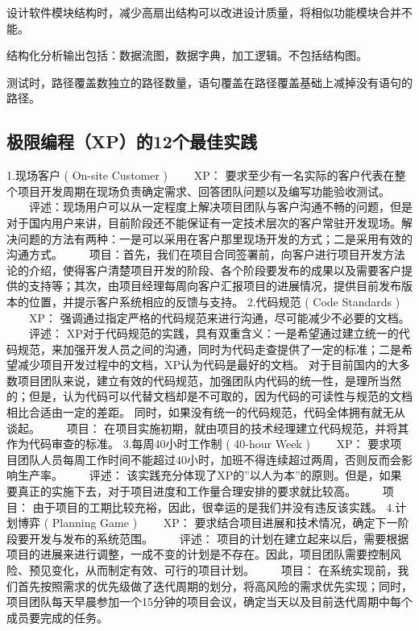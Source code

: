 \documentclass[UTF8]{../computerUniverse}
\begin{document}
设计软件模块结构时，减少高扇出结构可以改进设计质量，将相似功能模块合并不能。

结构化分析输出包括：数据流图，数据字典，加工逻辑。不包括结构图。




测试时，路径覆盖数独立的路径数量，语句覆盖在路径覆盖基础上减掉没有语句的路径。




\subsection{极限编程（XP）的12个最佳实践}
1.现场客户 ( On-site Customer )
　　XP： 要求至少有一名实际的客户代表在整个项目开发周期在现场负责确定需求、回答团队问题以及编写功能验收测试。
　　评述：现场用户可以从一定程度上解决项目团队与客户沟通不畅的问题，但是对于国内用户来讲，目前阶段还不能保证有一定技术层次的客户常驻开发现场。解决问题的方法有两种：一是可以采用在客户那里现场开发的方式；二是采用有效的沟通方式。
　　项目：首先，我们在项目合同签署前，向客户进行项目开发方法论的介绍，使得客户清楚项目开发的阶段、各个阶段要发布的成果以及需要客户提供的支持等；其次，由项目经理每周向客户汇报项目的进展情况，提供目前发布版本的位置，并提示客户系统相应的反馈与支持。
2.代码规范 ( Code Standards )
　　XP： 强调通过指定严格的代码规范来进行沟通，尽可能减少不必要的文档。
　　评述： XP对于代码规范的实践，具有双重含义：一是希望通过建立统一的代码规范，来加强开发人员之间的沟通，同时为代码走查提供了一定的标准；二是希望减少项目开发过程中的文档，XP认为代码是最好的文档。
对于目前国内的大多数项目团队来说，建立有效的代码规范，加强团队内代码的统一性，是理所当然的；但是，认为代码可以代替文档却是不可取的，因为代码的可读性与规范的文档相比合适由一定的差距。
同时，如果没有统一的代码规范，代码全体拥有就无从谈起。
　　项目： 在项目实施初期，就由项目的技术经理建立代码规范，并将其作为代码审查的标准。
3.每周40小时工作制 ( 40-hour Week )
　　XP： 要求项目团队人员每周工作时间不能超过40小时，加班不得连续超过两周，否则反而会影响生产率。
　　评述： 该实践充分体现了XP的”以人为本”的原则。但是，如果要真正的实施下去，对于项目进度和工作量合理安排的要求就比较高。
　　项目： 由于项目的工期比较充裕，因此，很幸运的是我们并没有违反该实践。
4.计划博弈 ( Planning Game )
　　XP： 要求结合项目进展和技术情况，确定下一阶段要开发与发布的系统范围。
　　评述： 项目的计划在建立起来以后，需要根据项目的进展来进行调整，一成不变的计划是不存在。因此，项目团队需要控制风险、预见变化，从而制定有效、可行的项目计划。
　　项目： 在系统实现前，我们首先按照需求的优先级做了迭代周期的划分，将高风险的需求优先实现；同时，项目团队每天早晨参加一个15分钟的项目会议，确定当天以及目前迭代周期中每个成员要完成的任务。
\end{document}
